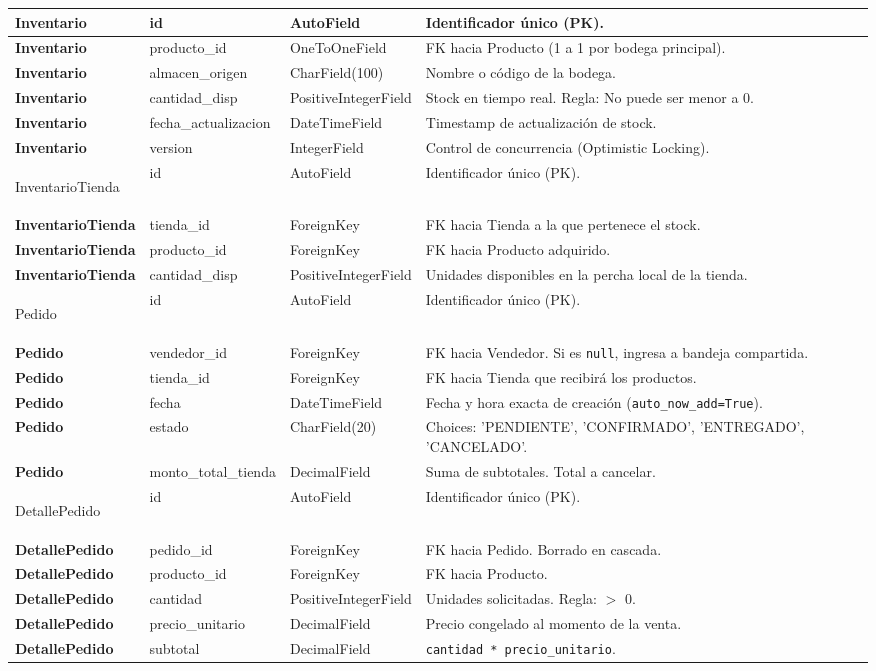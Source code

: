 \documentclass{article}
\begin{document}
\begin{longtable}{|>{\bfseries}p{3.2cm}|p{3.5cm}|p{2.8cm}|p{5.5cm}|}
Inventario & id & AutoField & Identificador único (PK). \\ \hline
Inventario & producto\_id & OneToOneField & FK hacia Producto (1 a 1 por bodega principal). \\ \hline
Inventario & almacen\_origen & CharField(100) & Nombre o código de la bodega. \\ \hline
Inventario & cantidad\_disp & Positive\-Integer\-Field & Stock en tiempo real. Regla: No puede ser menor a 0. \\ \hline
Inventario & fecha\_actualizacion & DateTimeField & Timestamp de actualización de stock. \\ \hline
Inventario & version & IntegerField & Control de concurrencia (Optimistic Locking). \\ \hline

Inventario\-Tienda & id & AutoField & Identificador único (PK). \\ \hline
Inventario\-Tienda & tienda\_id & ForeignKey & FK hacia Tienda a la que pertenece el stock. \\ \hline
Inventario\-Tienda & producto\_id & ForeignKey & FK hacia Producto adquirido. \\ \hline
Inventario\-Tienda & cantidad\_disp & Positive\-Integer\-Field & Unidades disponibles en la percha local de la tienda. \\ \hline

Pedido & id & AutoField & Identificador único (PK). \\ \hline
Pedido & vendedor\_id & ForeignKey & FK hacia Vendedor. Si es \texttt{null}, ingresa a bandeja compartida. \\ \hline
Pedido & tienda\_id & ForeignKey & FK hacia Tienda que recibirá los productos. \\ \hline
Pedido & fecha & DateTimeField & Fecha y hora exacta de creación (\texttt{auto\_now\_add=True}). \\ \hline
Pedido & estado & CharField(20) & Choices: 'PENDIENTE', 'CONFIRMADO', 'ENTREGADO', 'CANCELADO'. \\ \hline
Pedido & monto\_total\_tienda & DecimalField & Suma de subtotales. Total a cancelar. \\ \hline

DetallePedido & id & AutoField & Identificador único (PK). \\ \hline
DetallePedido & pedido\_id & ForeignKey & FK hacia Pedido. Borrado en cascada. \\ \hline
DetallePedido & producto\_id & ForeignKey & FK hacia Producto. \\ \hline
DetallePedido & cantidad & Positive\-Integer\-Field & Unidades solicitadas. Regla: $>$ 0. \\ \hline
DetallePedido & precio\_unitario & DecimalField & Precio congelado al momento de la venta. \\ \hline
DetallePedido & subtotal & DecimalField & \texttt{cantidad * precio\_unitario}. \\ \hline


\end{longtable}
\end{document}
